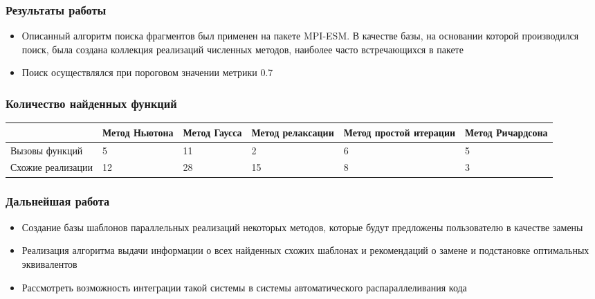 \documentclass{beamer}
\begin{document}
\begin{frame}
\frametitle{Результаты работы}
\begin{itemize}
	\item Описанный алгоритм поиска фрагментов был применен на пакете MPI-ESM. В
качестве базы, на основании которой производился поиск, была создана коллекция реализаций численных методов, наиболее часто встречающихся в пакете
	\item Поиск осуществлялся при пороговом значении метрики 0.7
\end{itemize}
\end{frame}

\begin{frame}
\frametitle{Количество найденных функций}
\begin{small}
\begin{center}
\renewcommand{\arraystretch}{1.8} %
\begin{tabular}{|p{1.6cm}|p{1.4cm}|p{1.0cm}|p{1.3cm}|p{1.5cm}|p{1.9cm}|}
\hline
 & Метод Ньютона &  Метод Гаусса & Метод релаксации & Метод простой итерации & Метод Ричардсона\\
\hline
Вызовы 
\newline функций & 5 & 11 & 2 & 6 & 5 \\
\hline
Схожие 
\newline реализации & 12 & 28 & 15 & 8 & 3\\
\hline
\end{tabular}
\end{center}
\end{small}
\end{frame}

\begin{frame}
\frametitle{Дальнейшая работа}
\begin{itemize}
	\item[\textbullet] Создание базы шаблонов параллельных реализаций некоторых методов, которые будут предложены пользователю в качестве замены 
	\item[\textbullet] Реализация алгоритма выдачи информации о всех найденных схожих шаблонах и рекомендаций о замене и подстановке оптимальных эквивалентов	
	\item[\textbullet] Рассмотреть возможность интеграции такой системы в системы автоматического распараллеливания кода
\end{itemize}
\end{frame}
\end{document}
